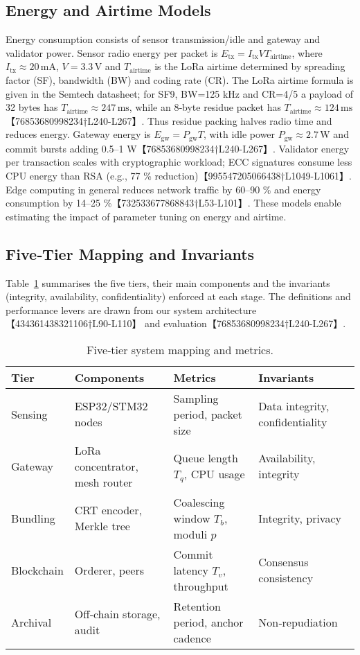 \documentclass[12pt,onecolumn]{IEEEtran} %
\begin{document}
\subsection{Energy and Airtime Models}
Energy consumption consists of sensor transmission/idle and gateway and validator power.
Sensor radio energy per packet is \(E_{\text{tx}} = I_{\text{tx}} V T_{\text{airtime}}\), where
\(I_{\text{tx}}\approx20\,\text{mA}\), \(V=3.3\,\text{V}\) and \(T_{\text{airtime}}\) is the
LoRa airtime determined by spreading factor (SF), bandwidth (BW) and coding rate (CR).  The
LoRa airtime formula is given in the Semtech datasheet; for SF9, BW=125 kHz and CR=4/5 a
payload of 32 bytes has \(T_{\text{airtime}}\approx247\,\text{ms}\), while an 8‑byte residue
packet has \(T_{\text{airtime}}\approx124\,\text{ms}\)【76853680998234†L240-L267】.  Thus residue packing halves
radio time and reduces energy.  Gateway energy is \(E_{\text{gw}} = P_{\text{gw}} T\), with
idle power \(P_{\text{gw}}\approx2.7\,\text{W}\) and commit bursts adding 0.5–1 W【76853680998234†L240-L267】.
Validator energy per transaction scales with cryptographic workload; ECC signatures
consume less CPU energy than RSA (e.g., 77 \% reduction)【995547205066438†L1049-L1061】.  Edge computing in
general reduces network traffic by 60–90 \% and energy consumption by 14–25 \%【732533677868843†L53-L101】.
These models enable estimating the impact of parameter tuning on energy and airtime.

\subsection{Five‑Tier Mapping and Invariants}
Table~\ref{tab:tier-map} summarises the five tiers, their main components and the
invariants (integrity, availability, confidentiality) enforced at each stage.  The
definitions and performance levers are drawn from our system architecture【434361438321106†L90-L110】 and
evaluation【76853680998234†L240-L267】.
\begin{table}[ht]
  \centering
  \caption{Five‑tier system mapping and metrics.}
  \label{tab:tier-map}
  \begin{tabular}{l l l l}
    \toprule
    \textbf{Tier} & \textbf{Components} & \textbf{Metrics} & \textbf{Invariants} \\
    \midrule
    Sensing & ESP32/STM32 nodes & Sampling period, packet size & Data integrity, confidentiality \\
    Gateway & LoRa concentrator, mesh router & Queue length \(T_q\), CPU usage & Availability, integrity \\
    Bundling & CRT encoder, Merkle tree & Coalescing window \(T_b\), moduli \(p\) & Integrity, privacy \\
    Blockchain & Orderer, peers & Commit latency \(T_v\), throughput & Consensus consistency \\
    Archival & Off‑chain storage, audit & Retention period, anchor cadence & Non‑repudiation \\
    \bottomrule
  \end{tabular}
\end{table}
\end{document}
